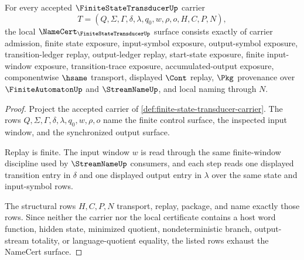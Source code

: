\begin{theorem}
\label{thm:finite-state-transducer-namecert-obligations}
For every accepted $\FiniteStateTransducerUp$ carrier
$$
T=(Q,\Sigma,\Gamma,\delta,\lambda,q_0,w,\rho,o,H,C,P,N),
$$
the local $\NameCert_{\FiniteStateTransducerUp}$ surface consists exactly of carrier admission, finite state exposure, input-symbol exposure, output-symbol exposure, transition-ledger replay, output-ledger replay, start-state exposure, finite input-window exposure, transition-trace exposure, accumulated-output exposure, componentwise $\hsame$ transport, displayed $\Cont$ replay, $\Pkg$ provenance over $\FiniteAutomatonUp$ and $\StreamNameUp$, and local naming through $N$.
\end{theorem}
\begin{proof}
Project the accepted carrier of \autoref{def:finite-state-transducer-carrier}. The rows $Q,\Sigma,\Gamma,\delta,\lambda,q_0,w,\rho,o$ name the finite control surface, the inspected input window, and the synchronized output surface.

Replay is finite. The input window $w$ is read through the same finite-window discipline used by $\StreamNameUp$ consumers, and each step reads one displayed transition entry in $\delta$ and one displayed output entry in $\lambda$ over the same state and input-symbol rows.

The structural rows $H,C,P,N$ transport, replay, package, and name exactly those rows. Since neither the carrier nor the local certificate contains a host word function, hidden state, minimized quotient, nondeterministic branch, output-stream totality, or language-quotient equality, the listed rows exhaust the NameCert surface.
\end{proof}

